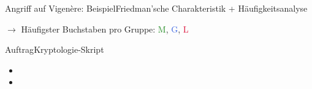 \begin{frame}{Angriff auf Vigenère: Beispiel}{Friedman'sche Charakteristik + Häufigkeitsanalyse}
	\texttt{}

	$\rightarrow$ Häufigster Buchstaben pro Gruppe: \textcolor{ForestGreen}{M}, \textcolor{RoyalBlue}{G}, \textcolor{Crimson}{L}

	\begin{figure}[H]
		\centering
		\resizebox{.75\textwidth}{!}{\caesar[8] \caesar[2] \caesar[7]}
	\end{figure}
\end{frame}

\begin{frame}{Auftrag}{Kryptologie-Skript}
	\begin{itemize}
		\item {}
		\item {}
	\end{itemize}
\end{frame}